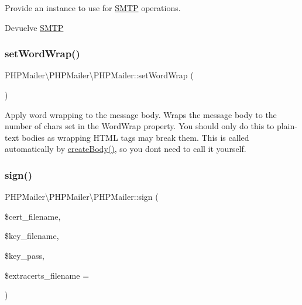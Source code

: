 Provide an instance to use for \hyperlink{classPHPMailer_1_1PHPMailer_1_1SMTP}{S\+M\+TP} operations.

\begin{DoxyReturn}{Devuelve}
\hyperlink{classPHPMailer_1_1PHPMailer_1_1SMTP}{S\+M\+TP} 
\end{DoxyReturn}
\mbox{\label{classPHPMailer_1_1PHPMailer_1_1PHPMailer_a1845ba64be41006391b0ae636a7062d2}} 
\subsubsection{\texorpdfstring{set\+Word\+Wrap()}{setWordWrap()}}
{\footnotesize\ttfamily P\+H\+P\+Mailer\textbackslash{}\+P\+H\+P\+Mailer\textbackslash{}\+P\+H\+P\+Mailer\+::set\+Word\+Wrap (\begin{DoxyParamCaption}{ }\end{DoxyParamCaption})}

Apply word wrapping to the message body. Wraps the message body to the number of chars set in the Word\+Wrap property. You should only do this to plain-\/text bodies as wrapping H\+T\+ML tags may break them. This is called automatically by \hyperlink{classPHPMailer_1_1PHPMailer_1_1PHPMailer_a7a1ec44917d07353f39bec4b38e64879}{create\+Body()}, so you don\textquotesingle{}t need to call it yourself. \mbox{\label{classPHPMailer_1_1PHPMailer_1_1PHPMailer_a8a3dcf3c7cae06970937c1e8e85241ea}} 
\subsubsection{\texorpdfstring{sign()}{sign()}}
{\footnotesize\ttfamily P\+H\+P\+Mailer\textbackslash{}\+P\+H\+P\+Mailer\textbackslash{}\+P\+H\+P\+Mailer\+::sign (\begin{DoxyParamCaption}\item[{}]{\$cert\+\_\+filename,  }\item[{}]{\$key\+\_\+filename,  }\item[{}]{\$key\+\_\+pass,  }\item[{}]{\$extracerts\+\_\+filename = {\ttfamily \textquotesingle{}\textquotesingle{}} }\end{DoxyParamCaption})}


